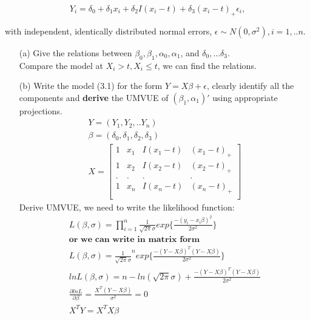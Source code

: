 \documentclass{homework}
\begin{document}
    \begin{equation}
     Y_i = \delta_0 + \delta_1 x_i + \delta_2I(x_i-t) + \delta_3 (x_i-t)_{+} \epsilon_i, 
    \end{equation}

with independent, identically distributed normal errors, $\epsilon \sim N(0, \sigma^2), i= 1,..n$.\\
\begin{itemize}
    \item [(a)] Give the relations between $\beta_0, \beta_1, \alpha_0, \alpha_1$, and $\delta_0,... \delta_3$.\\
    Compare the model at $X_i>t, X_i \leq t$, we can find the relations. 
    \item [(b)] Write the model (3.1) for the form $Y=X\beta + \epsilon$, clearly identify all the components and \textbf{derive} the UMVUE of $(\beta_1, \alpha_1)'$ using appropriate projections.\\
    \[ 
    \begin{split}
     Y = (Y_1, Y_2,.. Y_n) \\
     \beta = (\delta_0, \delta_1, \delta_2, \delta_3)\\
     X=  \begin{bmatrix}
           1 & x_1 & I(x_1 - t) & (x_1 -t)_{+} \\
           1 & x_2 & I(x_2 - t) & (x_2 -t)_{+}\\
           . & . & . & .\\
           1 & x_n & I(x_n - t) & (x_n -t)_{+}\\
         \end{bmatrix} 
    \end{split}
    \]     
    Derive UMVUE, we need to write the likelihood function:\\
    \[ 
    \begin{split}
    L(\beta, \sigma) = \prod_{i=1}^n \frac{1}{\sqrt{2\pi}\sigma} exp\{\frac{-(y_i-x_i\beta)^2}{2\sigma^2}\} \\
    \textbf{or we can write in matrix form}\\
    L(\beta, \sigma) = \frac{1}{\sqrt{2\pi}\sigma}^n exp\{\frac{-(Y-X\beta)^T(Y-X\beta)}{2\sigma^2}\} \\
    ln L(\beta, \sigma) = n -ln(\sqrt{2\pi}\sigma) + \frac{-(Y-X\beta)^T(Y-X\beta)}{2\sigma^2} \\
    \frac{\partial lnL}{\partial \beta} = \frac{X^T(Y-X\beta)}{\sigma^2} = 0\\
    X^TY = X^TX\beta\\

\end{split}\]
\end{itemize}
\end{document}
